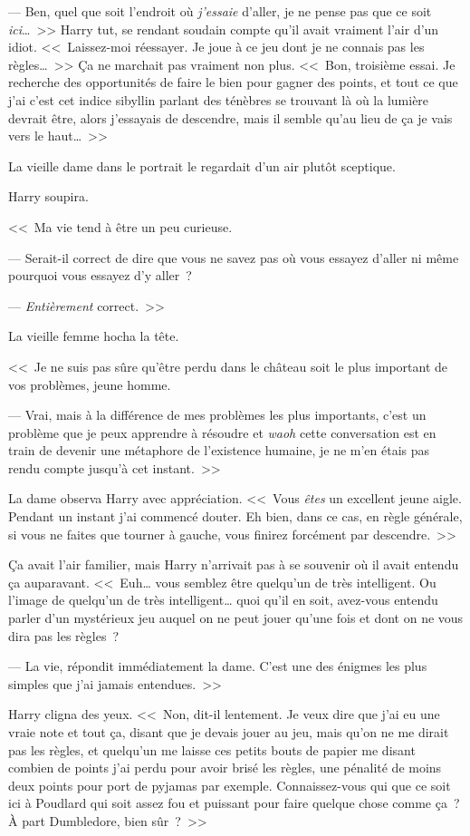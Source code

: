 --- Ben, quel que soit l'endroit où \emph{j'essaie} d'aller, je ne pense pas que ce soit \emph{ici}…~>> Harry tut, se rendant soudain compte qu'il avait vraiment l'air d'un idiot. <<~Laissez-moi réessayer. Je joue à ce jeu dont je ne connais pas les règles…~>> Ça ne marchait pas vraiment non plus. <<~Bon, troisième essai. Je recherche des opportunités de faire le bien pour gagner des points, et tout ce que j'ai c'est cet indice sibyllin parlant des ténèbres se trouvant là où la lumière devrait être, alors j'essayais de descendre, mais il semble qu'au lieu de ça je vais vers le haut…~>>

La vieille dame dans le portrait le regardait d'un air plutôt sceptique.

Harry soupira.

<<~Ma vie tend à être un peu curieuse.

--- Serait-il correct de dire que vous ne savez pas où vous essayez d'aller ni même pourquoi vous essayez d'y aller~?

--- \emph{Entièrement} correct.~>>

La vieille femme hocha la tête.

<<~Je ne suis pas sûre qu'être perdu dans le château soit le plus important de vos problèmes, jeune homme.

--- Vrai, mais à la différence de mes problèmes les plus importants, c'est un problème que je peux apprendre à résoudre et \emph{waoh} cette conversation est en train de devenir une métaphore de l'existence humaine, je ne m'en étais pas rendu compte jusqu'à cet instant.~>>

La dame observa Harry avec appréciation. <<~Vous \emph{êtes} un excellent jeune aigle. Pendant un instant j'ai commencé douter. Eh bien, dans ce cas, en règle générale, si vous ne faites que tourner à gauche, vous finirez forcément par descendre.~>>

Ça avait l'air familier, mais Harry n'arrivait pas à se souvenir où il avait entendu ça auparavant. <<~Euh… vous semblez être quelqu'un de très intelligent. Ou l'image de quelqu'un de très intelligent… quoi qu'il en soit, avez-vous entendu parler d'un mystérieux jeu auquel on ne peut jouer qu'une fois et dont on ne vous dira pas les règles~?

--- La vie, répondit immédiatement la dame. C'est une des énigmes les plus simples que j'ai jamais entendues.~>>

Harry cligna des yeux. <<~Non, dit-il lentement. Je veux dire que j'ai eu une vraie note et tout ça, disant que je devais jouer au jeu, mais qu'on ne me dirait pas les règles, et quelqu'un me laisse ces petits bouts de papier me disant combien de points j'ai perdu pour avoir brisé les règles, une pénalité de moins deux points pour port de pyjamas par exemple. Connaissez-vous qui que ce soit ici à Poudlard qui soit assez fou et puissant pour faire quelque chose comme ça~? À part Dumbledore, bien sûr~?~>>

